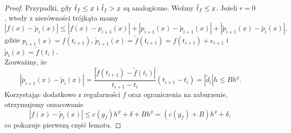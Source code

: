 \documentclass[oik, pdftex, man]{mgrwms}
\begin{document}
    \begin{proof}
        Przypadki, gdy $\hat{t}_{f} \leq x$ i $\hat{t}_{f} > x$ są analogiczne. Weźmy $\hat{t}_{f} \leq x$. Jeżeli $r=0$, wtedy z nierówności trójkąta mamy
        \begin{equation*}
            \left|f(x)-\tilde{p}_{i}(x)\right| \leq \left|f(x)-p_{i+1}(x)\right|+\left|p_{i+1}(x)-\tilde{p}_{i+1}(x)\right|+\left|\tilde{p}_{i+1}(x)-\tilde{p}_{i}(x)\right|,
        \end{equation*}
        gdzie $p_{i+1}(x) = f(t_{i+1})$, $\tilde{p}_{i+1}(x) = \tilde{f}(t_{i+1}) = f(t_{i+1}) + e_{i+1}$ i $\tilde{p}_{i}(x) = \tilde{f}(t_{i})$. \\
        Zauważmy, że
        \begin{equation*}
            \left|\tilde{p}_{i+1}(x)-\tilde{p}_{i}(x)\right| = \frac{|\tilde{f}(t_{i+1})-\tilde{f}(t_{i})|}{t_{i+1} - t_{i}} (t_{i+1} - t_{i}) = |\tilde{d}_{i}|h \leq Bh^{\varrho}.
        \end{equation*}
        Korzystając dodatkowo z regularności $f$ oraz ograniczenia na zaburzenie, otrzymujemy oszacowanie
        \begin{equation*}
            \left|f(x)-\tilde{p}_{i}(x)\right| \leq  c(g_{f}) h^{\varrho} + \delta + Bh^{\varrho} =  (c(g_{f}) + B)h^{\varrho} + \delta,
        \end{equation*}
        co pokazuje pierwszą część lematu.


\end{proof}
\end{document}
